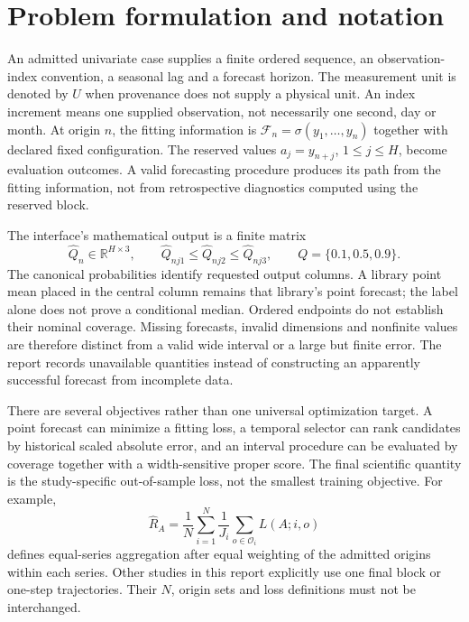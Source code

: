 \section{Problem formulation and notation}
\label{sec:problem}
An admitted univariate case supplies a finite ordered sequence, an observation-index convention, a seasonal lag and a forecast horizon. The measurement unit is denoted by $U$ when provenance does not supply a physical unit. An index increment means one supplied observation, not necessarily one second, day or month. At origin $n$, the fitting information is $\mathcal F_n=\sigma(y_1,\ldots,y_n)$ together with declared fixed configuration. The reserved values $a_j=y_{n+j}$, $1\le j\le H$, become evaluation outcomes. A valid forecasting procedure produces its path from the fitting information, not from retrospective diagnostics computed using the reserved block.

The interface's mathematical output is a finite matrix
\begin{equation}\label{eq:report-output}
 \widehat Q_n\in\mathbb R^{H\times3},\qquad
 \widehat Q_{nj1}\le\widehat Q_{nj2}\le\widehat Q_{nj3},
 \qquad Q=\{0.1,0.5,0.9\}.
\end{equation}
The canonical probabilities identify requested output columns. A library point mean placed in the central column remains that library's point forecast; the label alone does not prove a conditional median. Ordered endpoints do not establish their nominal coverage. Missing forecasts, invalid dimensions and nonfinite values are therefore distinct from a valid wide interval or a large but finite error. The report records unavailable quantities instead of constructing an apparently successful forecast from incomplete data.

There are several objectives rather than one universal optimization target. A point forecast can minimize a fitting loss, a temporal selector can rank candidates by historical scaled absolute error, and an interval procedure can be evaluated by coverage together with a width-sensitive proper score. The final scientific quantity is the study-specific out-of-sample loss, not the smallest training objective. For example,
\begin{equation}\label{eq:report-estimand}
 \widehat R_A=\frac1N\sum_{i=1}^{N}\frac1{J_i}
       \sum_{o\in\mathcal O_i} L(A;i,o)
\end{equation}
defines equal-series aggregation after equal weighting of the admitted origins within each series. Other studies in this report explicitly use one final block or one-step trajectories. Their $N$, origin sets and loss definitions must not be interchanged.

